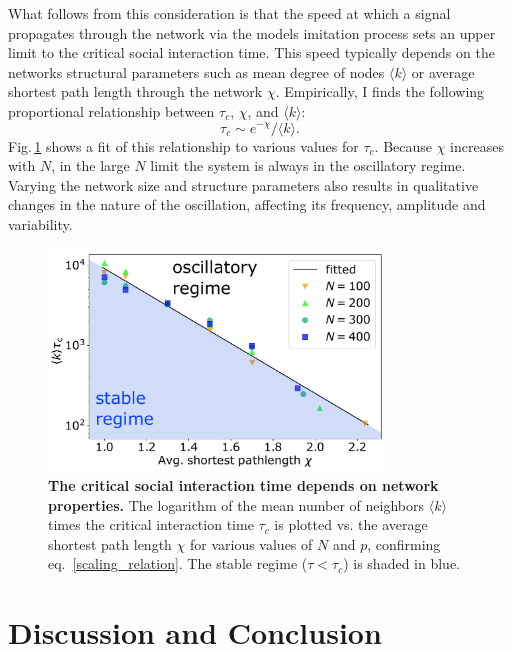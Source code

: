 What follows from this consideration is that the speed at which a signal propagates through the network via the models imitation process sets an upper limit to the critical social interaction time. This speed typically depends on the networks structural parameters such as mean degree of nodes $\langle k \rangle$ or average shortest path length through the network $\chi$.
Empirically, I finds the following proportional relationship between $\tau_c$, $\chi$, and $\langle k \rangle$:
\begin{equation}
\tau_c \sim e^{-\chi} / \langle k \rangle.
\label{scaling_relation}
\end{equation}  
Fig.\,\ref{taucrit} shows a fit of this relationship to various values for $\tau_{c}$.  Because $\chi$ increases with $N$, in the large $N$ limit the system is always in the oscillatory regime. Varying the network size and structure parameters also results in qualitative changes in the nature of the oscillation, affecting its frequency, amplitude and variability.

\begin{figure}[t]
     \centering
       \includegraphics[width=0.8\textwidth]
       {figures/fig4.pdf}
       \caption[Scalling behavior of critical social interaction time]{\textbf{The critical social interaction time depends on network properties.}
	The logarithm of the mean number of neighbors $\langle k \rangle$  times the critical interaction time $\tau_{c}$ is plotted vs. the average shortest path length $\chi$ for various values of $N$ and $p$, confirming eq.~\eqref{scaling_relation}. The stable regime ($\tau \! < \! \tau_{c}$) is shaded in blue. 
   \label{taucrit}}
\end{figure}

\section{Discussion and Conclusion}

